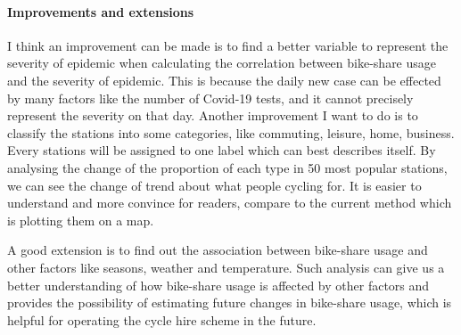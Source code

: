 \documentclass[11pt,a4paper]{article}
\begin{document}


\paragraph{Improvements and extensions}
I think an improvement can be made is to find a better variable to represent the severity of epidemic when calculating the correlation between bike-share usage and the severity of epidemic. This is because the daily new case can be effected by many factors like the number of Covid-19 tests, and it cannot precisely represent the severity on that day. Another improvement I want to do is to classify the stations into some categories, like commuting, leisure, home, business. Every stations will be assigned to one label which can best describes itself. By analysing the change of the proportion of each type in 50 most popular stations, we can see the change of trend about what people cycling for. It is easier to understand and more convince for readers, compare to the current method which is plotting them on a map. 

A good extension is to find out the association between bike-share usage and other factors like seasons, weather and temperature. Such analysis can give us a better understanding of how bike-share usage is affected by other factors and provides the possibility of estimating future changes in bike-share usage, which is helpful for operating the cycle hire scheme in the future.



\end{document}
